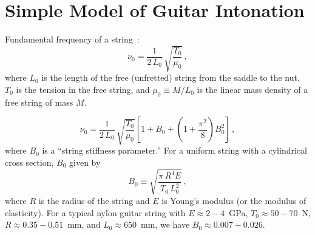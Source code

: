 %
%
%

 \section{Simple Model of Guitar Intonation\label{sct:model}}

Fundamental frequency of a string~\cite{ref:morse1981vas,ref:morse1981vsa}:
 \begin{equation} \label{eqn:nu_0_def}
\nu_0 = \frac{1}{2\, L_0}\, \sqrt{\frac{T_0}{\mu_0}}\, ,
 \end{equation}
where $L_0$ is the length of the free (unfretted) string from the saddle to the nut, $T_0$ is the tension in the free string, and $\mu_0 \equiv M / L_0$ is the linear mass density of a free string of mass $M$.

 \begin{equation} \label{eqn:nu_0_stiff}
\nu_0 = \frac{1}{2\, L_0}\, \sqrt{\frac{T_0}{\mu_0}} \left[ 1 + B_0 + \left(1 + \frac{\pi^2}{8}\right) B_0^2 \right]\, ,
 \end{equation}
where $B_0$ is a ``string stiffness parameter.'' For a uniform string with a cylindrical cross section, $B_0$ given by~\cite{ref:morse1981vsb}
 \begin{equation} \label{eqn:b_def}
B_0 \equiv \sqrt{\frac{\pi\, R^4 E}{T_0\, L_0^2}}\, ,
 \end{equation}
where $R$ is the radius of the string and $E$ is Young's modulus (or the modulus of elasticity). For a typical nylon guitar string with $E \approx 2 - 4$~GPa, $T_0 \approx 50 - 70$~N, $R \approx 0.35 - 0.51$~mm, and $L_0 \approx 650$~mm, we have $B_0 \approx 0.007 - 0.026$. 